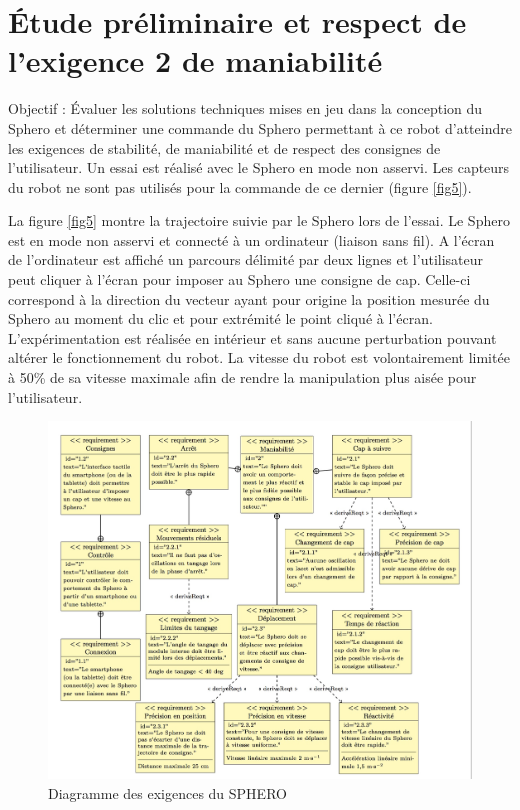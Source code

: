 \section{Étude préliminaire et respect de l'exigence 2 de maniabilité} 

Objectif : Évaluer les solutions techniques mises en jeu dans la conception du Sphero et déterminer une commande du Sphero permettant à ce robot d'atteindre les exigences de stabilité, de maniabilité et de respect des consignes de l'utilisateur. 
Un essai est réalisé avec le Sphero en mode non asservi. Les capteurs du robot ne sont pas utilisés pour la commande de ce dernier (figure \ref{fig5}). 

La figure \ref{fig5} montre la trajectoire suivie par le Sphero lors de l'essai. Le Sphero est en mode non asservi et connecté à un ordinateur (liaison sans fil). A l'écran de l'ordinateur est affiché un parcours délimité par deux lignes et l'utilisateur peut cliquer à l'écran pour imposer au Sphero une consigne de cap. Celle-ci correspond à la direction du vecteur ayant pour origine la position mesurée du Sphero au moment du clic et pour extrémité le point cliqué à l'écran. L'expérimentation est réalisée en intérieur et sans aucune perturbation pouvant altérer le fonctionnement du robot. La vitesse du robot est volontairement limitée à 50\% de sa vitesse maximale afin de rendre la manipulation plus aisée pour l'utilisateur. 


\begin{figure}[!ht]\begin{center}
 \includegraphics[width=\linewidth]{img/figure_4}
 \caption{Diagramme des exigences du SPHERO}
 \label{fig4}
\end{center}\end{figure}

